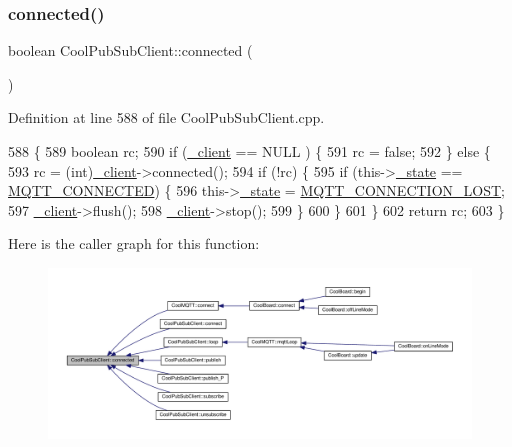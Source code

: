 \subsubsection{\texorpdfstring{connected()}{connected()}}
{\footnotesize\ttfamily boolean Cool\+Pub\+Sub\+Client\+::connected (\begin{DoxyParamCaption}{ }\end{DoxyParamCaption})}



Definition at line 588 of file Cool\+Pub\+Sub\+Client.\+cpp.


\begin{DoxyCode}
588                                     \{
589     \textcolor{keywordtype}{boolean} rc;
590     \textcolor{keywordflow}{if} (\hyperlink{class_cool_pub_sub_client_a487a65bafb6e3b8e9ab544b13a8878a0}{\_client} == NULL ) \{
591         rc = \textcolor{keyword}{false};
592     \} \textcolor{keywordflow}{else} \{
593         rc = (int)\hyperlink{class_cool_pub_sub_client_a487a65bafb6e3b8e9ab544b13a8878a0}{\_client}->connected();
594         \textcolor{keywordflow}{if} (!rc) \{
595             \textcolor{keywordflow}{if} (this->\hyperlink{class_cool_pub_sub_client_aa1953b601206252a30efa5b114eb3e1a}{\_state} == \hyperlink{_cool_pub_sub_client_8h_abb5539db14c26155eebe929fa84d1e96}{MQTT\_CONNECTED}) \{
596                 this->\hyperlink{class_cool_pub_sub_client_aa1953b601206252a30efa5b114eb3e1a}{\_state} = \hyperlink{_cool_pub_sub_client_8h_ad8f5592739ea2c329fe320ffa14731e9}{MQTT\_CONNECTION\_LOST};
597                 \hyperlink{class_cool_pub_sub_client_a487a65bafb6e3b8e9ab544b13a8878a0}{\_client}->flush();
598                 \hyperlink{class_cool_pub_sub_client_a487a65bafb6e3b8e9ab544b13a8878a0}{\_client}->stop();
599             \}
600         \}
601     \}
602     \textcolor{keywordflow}{return} rc;
603 \}
\end{DoxyCode}
Here is the caller graph for this function\+:\nopagebreak
\begin{figure}[H]
\begin{center}
\leavevmode
\includegraphics[width=350pt]{d8/d4b/class_cool_pub_sub_client_a3d5a5da4ddb1e5c1bea64d80c665d148_icgraph}
\end{center}
\end{figure}
\mbox{\label{class_cool_pub_sub_client_a60bd133e45bebc921f6df20f45106490}} 
